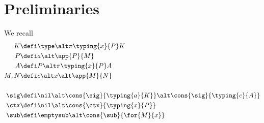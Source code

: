 \clearpage

\section*{Preliminaries}

We recall
\begin{align*}
  K &\defi \type \alt \pi{\typing{x}{P}}{K} \\
  P &\defi a \alt \app{P}{M} \\
  A &\defi P \alt \pi{\typing{x}{P}}{A} \\
  M, N &\defi c \alt x \alt \app{M}{N} \\
  \\
  \sig &\defi \nil \alt \cons{\sig}{\typing{a}{K}} \alt \cons{\sig}{\typing{c}{A}} \\
  \ctx &\defi \nil \alt \cons{\ctx}{\typing{x}{P}} \\
  \sub &\defi \emptysub \alt \cons{\sub}{\for{M}{x}}
\end{align*}

{ %
\vspace{0.5cm}
\noindent {}

\begin{prooftree}
\end{prooftree}

\begin{prooftree}
\end{prooftree}

\begin{prooftree}
\end{prooftree}

\vspace{0.5cm}
}

{ %
\vspace{0.5cm}
\noindent {}

\begin{prooftree}
\end{prooftree}

\begin{prooftree}
\end{prooftree}

\vspace{0.5cm}
}

